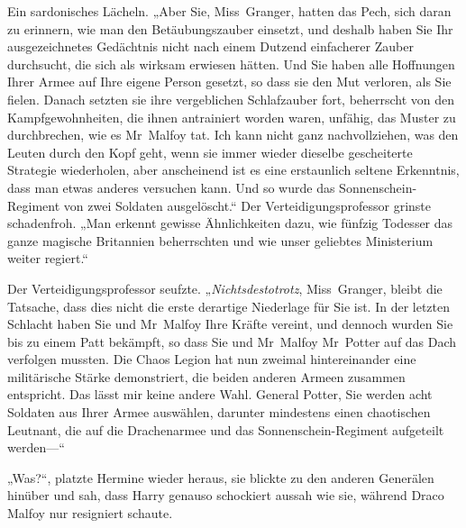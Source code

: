 Ein sardonisches Lächeln. „Aber Sie, Miss~Granger, hatten das Pech, sich daran zu erinnern, wie man den Betäubungszauber einsetzt, und deshalb haben Sie Ihr ausgezeichnetes Gedächtnis nicht nach einem Dutzend einfacherer Zauber durchsucht, die sich als wirksam erwiesen hätten. Und Sie haben alle Hoffnungen Ihrer Armee auf Ihre eigene Person gesetzt, so dass sie den Mut verloren, als Sie fielen. Danach setzten sie ihre vergeblichen Schlafzauber fort, beherrscht von den Kampfgewohnheiten, die ihnen antrainiert worden waren, unfähig, das Muster zu durchbrechen, wie es Mr~Malfoy tat. Ich kann nicht ganz nachvollziehen, was den Leuten durch den Kopf geht, wenn sie immer wieder dieselbe gescheiterte Strategie wiederholen, aber anscheinend ist es eine erstaunlich seltene Erkenntnis, dass man etwas anderes versuchen kann. Und so wurde das Sonnenschein-Regiment von zwei Soldaten ausgelöscht.“ Der Verteidigungsprofessor grinste schadenfroh. „Man erkennt gewisse Ähnlichkeiten dazu, wie fünfzig Todesser das ganze magische Britannien beherrschten und wie unser geliebtes Ministerium weiter regiert.“

Der Verteidigungsprofessor seufzte. „\emph{Nichtsdestotrotz}, Miss~Granger, bleibt die Tatsache, dass dies nicht die erste derartige Niederlage für Sie ist. In der letzten Schlacht haben Sie und Mr~Malfoy Ihre Kräfte vereint, und dennoch wurden Sie bis zu einem Patt bekämpft, so dass Sie und Mr~Malfoy Mr~Potter auf das Dach verfolgen mussten. Die Chaos Legion hat nun zweimal hintereinander eine militärische Stärke demonstriert, die beiden anderen Armeen zusammen entspricht. Das lässt mir keine andere Wahl. General Potter, Sie werden acht Soldaten aus Ihrer Armee auswählen, darunter mindestens einen chaotischen Leutnant, die auf die Drachenarmee und das Sonnenschein-Regiment aufgeteilt werden—“

„Was?“, platzte Hermine wieder heraus, sie blickte zu den anderen Generälen hinüber und sah, dass Harry genauso schockiert aussah wie sie, während Draco Malfoy nur resigniert schaute.

